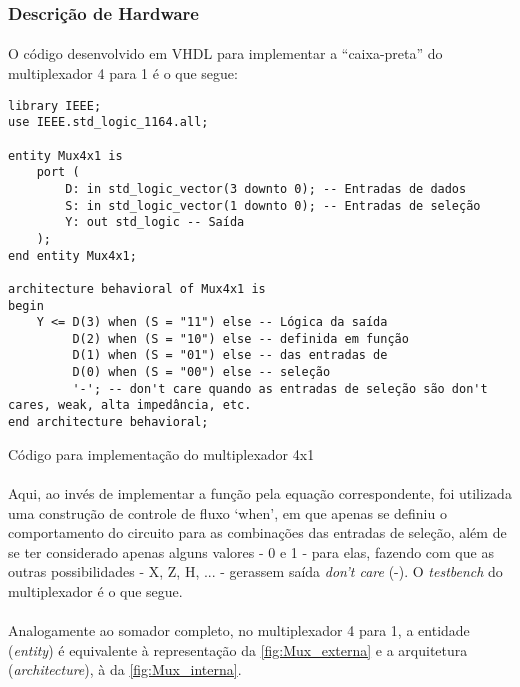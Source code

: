 \documentclass[a4paper,12pt]{article}
\newenvironment{code}{\captionsetup{type=listing}}{}
\begin{document}
\subsubsection{Descrição de Hardware}
\paragraph{}
O código desenvolvido em VHDL para implementar a ``caixa-preta'' do multiplexador 4 para 1 é o que segue:

\begin{code}
\begin{verbatim}
library IEEE;
use IEEE.std_logic_1164.all;

entity Mux4x1 is
    port (
        D: in std_logic_vector(3 downto 0); -- Entradas de dados
        S: in std_logic_vector(1 downto 0); -- Entradas de seleção
        Y: out std_logic -- Saída
    );
end entity Mux4x1;

architecture behavioral of Mux4x1 is
begin
    Y <= D(3) when (S = "11") else -- Lógica da saída
         D(2) when (S = "10") else -- definida em função
         D(1) when (S = "01") else -- das entradas de
         D(0) when (S = "00") else -- seleção
         '-'; -- don't care quando as entradas de seleção são don't cares, weak, alta impedância, etc.
end architecture behavioral;
\end{verbatim}
\caption{Código para implementação do multiplexador 4x1}
\end{code}

\paragraph{}
Aqui, ao invés de implementar a função pela equação correspondente, foi utilizada uma construção de controle de fluxo `when', em que apenas se definiu o comportamento do circuito para as combinações das entradas de seleção, além de se ter considerado apenas alguns valores - 0 e 1 - para elas, fazendo com que as outras possibilidades - X, Z, H, ... - gerassem saída \textit{don't care} (-). O \textit{testbench} do multiplexador é o que segue.

\paragraph{}
Analogamente ao somador completo, no multiplexador 4 para 1, a entidade (\textit{entity}) é equivalente à representação da \autoref{fig:Mux_externa} e a arquitetura (\textit{architecture}), à da \autoref{fig:Mux_interna}.
\end{document}
